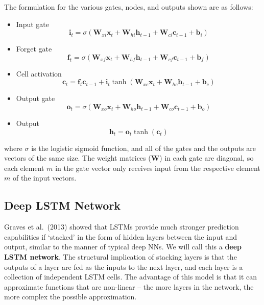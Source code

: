 \documentclass[12pt,a4paper,twoside,openright]{report}
\renewcommand{\vec}[1]{\mathbf{#1}}
\begin{document}
The formulation for the various gates, nodes, and outputs shown are as follows:
\begin{itemize}
	\item
	Input gate
	\begin{equation}
		\vec{i}_t = \sigma(\vec{W}_{xi}\vec{x}_t + \vec{W}_{hi}\vec{h}_{t-1} + \vec{W}_{ci}\vec{c}_{t-1} + \vec{b}_i)
	\end{equation}
	
	\item
	Forget gate
	\begin{equation}
		\vec{f}_t = \sigma(\vec{W}_{xf}\vec{x}_t + \vec{W}_{hf}\vec{h}_{t-1} + \vec{W}_{cf}\vec{c}_{t-1} + \vec{b}_f)
	\end{equation}
	
	\item
	Cell activation
	\begin{equation}
		\vec{c}_t = \vec{f}_t\vec{c}_{t-1} + \vec{i}_t\tanh(\vec{W}_{xc}\vec{x}_t + \vec{W}_{hc}\vec{h}_{t-1} + \vec{b}_c)
	\end{equation}
	
	\item
	Output gate
	\begin{equation}
		\vec{o}_t = \sigma(\vec{W}_{xo}\vec{x}_t + \vec{W}_{ho}\vec{h}_{t-1} + \vec{W}_{co}\vec{c}_{t-1} + \vec{b}_o)
	\end{equation}
	
	\item
	Output
	\begin{equation}
		\vec{h}_t = \vec{o}_t\tanh(\vec{c}_t)
	\end{equation}
	
\end{itemize}
where $\sigma$ is the logistic sigmoid function, and all of the gates and the outputs are vectors
of the same size. The weight matrices ($\vec{W}$) in each gate are diagonal, so each element $m$ in the gate
vector only receives input from the respective element $m$ of the input vectors. 

\subsection{Deep LSTM Network}
\label{sec:introDeepLSTM}

Graves et al.\ (2013) showed that LSTMs provide much stronger prediction capabilities if `stacked'
in the form of hidden layers between the input and output, similar to the manner of typical deep
NNs\cite{Graves13}. We will call this a \textbf{deep LSTM network}.
The structural implication of stacking layers is that the outputs of a layer
are fed as the inputs to the next layer, and each layer is a collection of independent
LSTM cells. The advantage of this model is that it can approximate functions that are non-linear --
the more layers in the network, the more complex the possible approximation.
\end{document}
